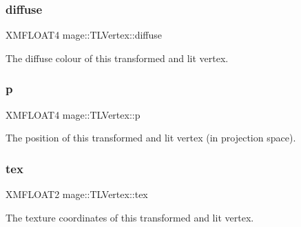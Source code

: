\subsubsection{\texorpdfstring{diffuse}{diffuse}}
{\footnotesize\ttfamily X\+M\+F\+L\+O\+A\+T4 mage\+::\+T\+L\+Vertex\+::diffuse}

The diffuse colour of this transformed and lit vertex. \hypertarget{structmage_1_1_t_l_vertex_a5ac68e9f9767dae9455134891712baf1}{}\label{structmage_1_1_t_l_vertex_a5ac68e9f9767dae9455134891712baf1} 
\subsubsection{\texorpdfstring{p}{p}}
{\footnotesize\ttfamily X\+M\+F\+L\+O\+A\+T4 mage\+::\+T\+L\+Vertex\+::p}

The position of this transformed and lit vertex (in projection space). \hypertarget{structmage_1_1_t_l_vertex_a17f1147ee6b76ea2e99364ed008c1ea2}{}\label{structmage_1_1_t_l_vertex_a17f1147ee6b76ea2e99364ed008c1ea2} 
\subsubsection{\texorpdfstring{tex}{tex}}
{\footnotesize\ttfamily X\+M\+F\+L\+O\+A\+T2 mage\+::\+T\+L\+Vertex\+::tex}

The texture coordinates of this transformed and lit vertex. 